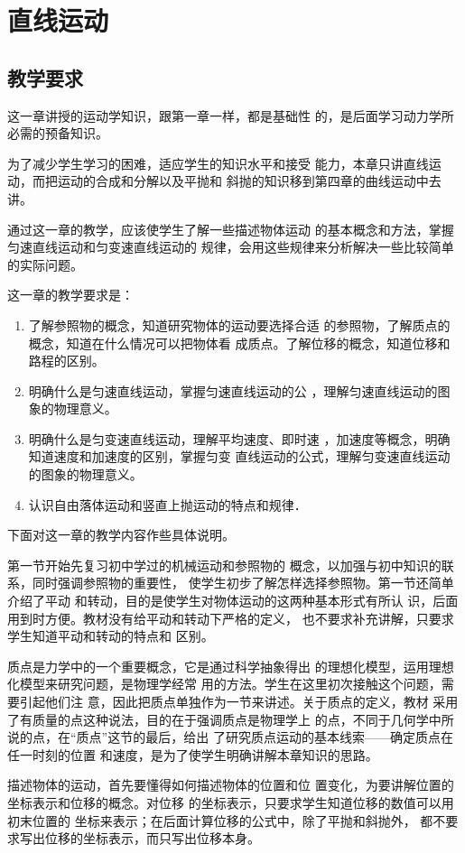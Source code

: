 \chapter{直线运动}\minitoc[n]
\section{教学要求}
这一章讲授的运动学知识，跟第一章一样，都是基础性
的，是后面学习动力学所必需的预备知识。

为了减少学生学习的困难，适应学生的知识水平和接受
能力，本章只讲直线运动，而把运动的合成和分解以及平抛和
斜抛的知识移到第四章的曲线运动中去讲。

通过这一章的教学，应该使学生了解一些描述物体运动
的基本概念和方法，掌握匀速直线运动和匀变速直线运动的
规律，会用这些规律来分析解决一些比较简单的实际问题。

这一章的教学要求是：
\begin{enumerate}
\item 了解参照物的概念，知道研究物体的运动要选择合适
的参照物，了解质点的概念，知道在什么情况可以把物体看
成质点。了解位移的概念，知道位移和路程的区别。
\item 明确什么是匀速直线运动，掌握匀速直线运动的公
，理解匀速直线运动的图象的物理意义。
\item 明确什么是匀变速直线运动，理解平均速度、即时速
，加速度等概念，明确知道速度和加速度的区别，掌握匀变
直线运动的公式，理解匀变速直线运动的图象的物理意义。
\item 认识自由落体运动和竖直上抛运动的特点和规律．
\end{enumerate}

下面对这一章的教学内容作些具体说明。

第一节开始先复习初中学过的机械运动和参照物的
概念，以加强与初中知识的联系，同时强调参照物的重要性，
使学生初步了解怎样选择参照物。第一节还简单介绍了平动
和转动，目的是使学生对物体运动的这两种基本形式有所认
识，后面用到时方便。教材没有给平动和转动下严格的定义，
也不要求补充讲解，只要求学生知道平动和转动的特点和
区别。

质点是力学中的一个重要概念，它是通过科学抽象得出
的理想化模型，运用理想化模型来研究问题，是物理学经常
用的方法。学生在这里初次接触这个问题，需要引起他们注
意，因此把质点单独作为一节来讲述。关于质点的定义，教材
采用了有质量的点这种说法，目的在于强调质点是物理学上
的点，不同于几何学中所说的点，在“质点”这节的最后，给出
了研究质点运动的基本线索——确定质点在任一时刻的位置
和速度，是为了使学生明确讲解本章知识的思路。

描述物体的运动，首先要懂得如何描述物体的位置和位
置变化，为要讲解位置的坐标表示和位移的概念。对位移
的坐标表示，只要求学生知道位移的数值可以用初末位置的
坐标来表示；在后面计算位移的公式中，除了平抛和斜抛外，
都不要求写出位移的坐标表示，而只写出位移本身。

